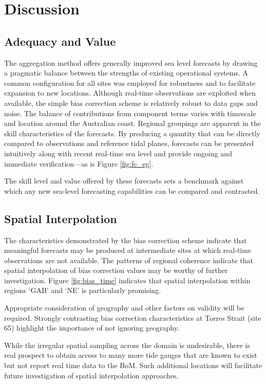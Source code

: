 \documentclass[jmse,article,accept,moreauthors,pdftex,10pt,a4paper]{mdpi}
\begin{document}
\section{Discussion}
\vspace{-6pt}
\subsection{Adequacy and Value}
The aggregation method offers generally improved sea level forecasts by drawing a pragmatic balance between the strengths of existing operational systems.
A common configuration for all sites was employed for robustness and to facilitate expansion to new locations.  
Although real-time observations are exploited when available, the simple bias correction scheme is relatively robust to data gaps and noise. 
The balance of contributions from component terms varies with timescale and location around the Australian coast.
Regional groupings are apparent in the skill characteristics of the forecasts.
By producing a quantity that can be directly compared to observations and reference tidal planes, forecasts can be presented intuitively along with recent real-time sea level and provide ongoing and immediate verification---as is Figure \ref{fig:fc_eg}.

The skill level and value offered by these forecasts sets a benchmark against which any new sea-level forecasting capabilities can be compared and contrasted.  

\subsection{Spatial Interpolation}
The characteristics demonstrated by the bias correction scheme indicate that meaningful forecasts may be produced at intermediate sites at which real-time observations are not available.
The patterns of regional coherence indicate that spatial interpolation of bias correction values may be worthy of further investigation.
Figure \ref{fig:bias_time} indicates that spatial interpolation within regions `GAB' and `NE' is particularly promising.

Appropriate consideration of geography and other factors on validity will be required.
Strongly contrasting bias correction characteristics at Torres Strait (site 65) highlight the importance of not ignoring geography.

While the irregular spatial sampling across the domain is undesirable, there is real prospect to obtain access to many more tide gauges that are known to exist but not report real time data to the BoM.   
Such additional locations will facilitate future investigation of spatial interpolation approaches.    
\end{document}
